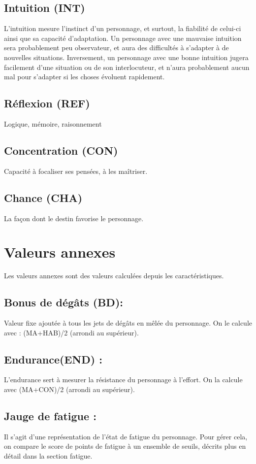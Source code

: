 \documentclass[10pt,a4paper,twocolumn]{book}
\begin{document}
\subsection{Intuition (INT)}
L’intuition mesure l’instinct d’un personnage, et surtout, la fiabilité de celui-ci ainsi que sa capacité d’adaptation.
Un personnage avec une mauvaise intuition sera probablement peu observateur, et aura des difficultés à s’adapter à de nouvelles situations. Inversement, un personnage avec une bonne intuition jugera facilement d’une situation ou de son interlocuteur, et n’aura probablement aucun mal pour s’adapter si les choses évoluent rapidement.
\subsection{Réflexion (REF)}
Logique, mémoire, raisonnement
\subsection{Concentration (CON)}
Capacité à focaliser ses pensées, à les maîtriser.
\subsection{Chance (CHA)}
La façon dont le destin favorise le personnage.
\section{Valeurs annexes}
Les valeurs annexes sont des valeurs calculées depuis les caractéristiques.
\subsection{Bonus de dégâts (BD):}
Valeur fixe ajoutée à tous les jets de dégâts en mêlée du personnage. On le calcule avec : (MA+HAB)/2 (arrondi au supérieur).
\subsection{Endurance(END) :}
L’endurance sert à mesurer la résistance du personnage à l’effort. On la calcule avec (MA+CON)/2 (arrondi au supérieur).
\subsection{Jauge de fatigue :}
Il s’agit d’une représentation de l’état de fatigue du personnage. Pour gérer cela, on compare le score de points de fatigue à un ensemble de seuils, décrits plus en détail dans la section fatigue.
\end{document}

